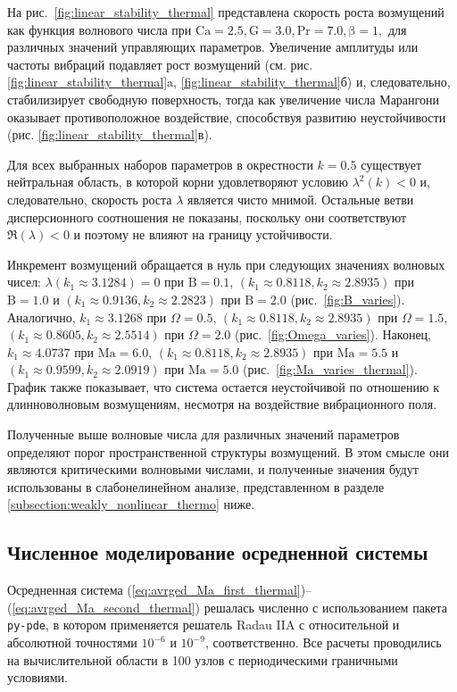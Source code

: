 \documentclass[12pt,a4paper]{article}
\begin{document}
На рис.~\ref{fig:linear_stability_thermal} представлена скорость роста возмущений как функция волнового числа при
$
\mathrm{Ca}=2.5,
\mathrm{G}=3.0,
\mathrm{Pr}=7.0,
\mathrm{\beta}=1,
$
для различных значений управляющих параметров.
Увеличение амплитуды или частоты вибраций подавляет рост возмущений (см. рис. \ref{fig:linear_stability_thermal}a, \ref{fig:linear_stability_thermal}б) и, следовательно, стабилизирует свободную поверхность, тогда как увеличение числа Марангони оказывает противоположное воздействие, способствуя развитию неустойчивости (рис. \ref{fig:linear_stability_thermal}в).

Для всех выбранных наборов параметров в окрестности $k=0.5$ существует нейтральная область, в которой корни удовлетворяют условию $\lambda^2(k)<0$ и, следовательно, скорость роста $\lambda$ является чисто мнимой.
Остальные ветви дисперсионного соотношения не показаны, поскольку они соответствуют $\Re(\lambda)<0$ и поэтому не влияют на границу устойчивости.


Инкремент возмущений обращается в нуль при следующих значениях волновых чисел:
$\lambda(k_1\approx3.1284)=0$ при $\mathrm{B}=0.1$,
$(k_1\approx0.8118,k_2\approx2.8935)$ при $\mathrm{B}=1.0$
и $(k_1\approx0.9136,k_2\approx2.2823)$ при $\mathrm{B}=2.0$ (рис.~\ref{fig:B_varies}).
Аналогично,
$k_1\approx3.1268$ при $\Omega=0.5$,
$(k_1\approx0.8118,k_2\approx2.8935)$ при $\Omega=1.5$,
$(k_1\approx0.8605,k_2\approx2.5514)$ при $\Omega=2.0$ (рис.~\ref{fig:Omega_varies}).
Наконец,
$k_1\approx4.0737$ при $\mathrm{Ma}=6.0$,
$(k_1\approx0.8118, k_2\approx2.8935)$ при $\mathrm{Ma}=5.5$
и $(k_1\approx0.9599,k_2\approx2.0919)$ при $\mathrm{Ma}=5.0$ (рис.~\ref{fig:Ma_varies_thermal}).
График также показывает, что система остается неустойчивой по отношению к длинноволновым возмущениям, несмотря на воздействие вибрационного поля.

Полученные выше волновые числа для различных значений параметров определяют порог пространственной структуры возмущений.
В этом смысле они являются критическими волновыми числами, и полученные значения будут использованы в слабонелинейном анализе, представленном в разделе \ref{subsection:weakly_nonlinear_thermo} ниже.

\subsection{Численное моделирование осредненной системы}

Осредненная система (\ref{eq:avrged_Ma_first_thermal})--(\ref{eq:avrged_Ma_second_thermal}) решалась численно с использованием пакета \texttt{py-pde}, в котором применяется решатель Radau IIA \cite{Hairer1991, Zwicker2020} с относительной и абсолютной точностями $10^{-6}$ и $10^{-9}$, соответственно. Все расчеты проводились на вычислительной области в 100 узлов с периодическими граничными условиями.
\end{document}
